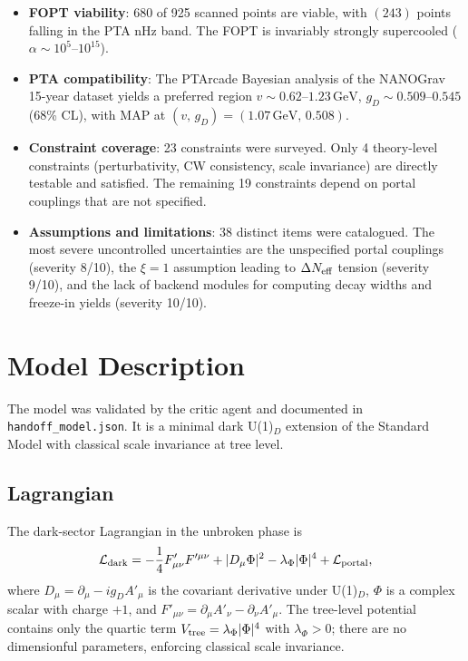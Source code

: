 \documentclass[a4paper,11pt]{article}
\newcommand{\GeV}{\,\text{GeV}}
\begin{document}
\begin{itemize}
\item \textbf{FOPT viability}: 680 of 925 scanned points are viable, with $(243)$ points falling in the PTA nHz band. The FOPT is invariably strongly supercooled ($\alpha \sim 10^5$--$10^{15}$).
\item \textbf{PTA compatibility}: The PTArcade Bayesian analysis of the NANOGrav 15-year dataset yields a preferred region $v \sim 0.62$--$1.23\GeV$, $g_D \sim 0.509$--$0.545$ (68\% CL), with MAP at $(v,\,g_D) = (1.07\GeV,\,0.508)$.
\item \textbf{Constraint coverage}: 23 constraints were surveyed. Only 4 theory-level constraints (perturbativity, CW consistency, scale invariance) are directly testable and satisfied. The remaining 19 constraints depend on portal couplings that are not specified.
\item \textbf{Assumptions and limitations}: 38 distinct items were catalogued. The most severe uncontrolled uncertainties are the unspecified portal couplings (severity 8/10), the $\xi=1$ assumption leading to $\Delta N_{\rm eff}$ tension (severity 9/10), and the lack of backend modules for computing decay widths and freeze-in yields (severity 10/10).
\end{itemize}

\section{Model Description}

The model was validated by the critic agent and documented in \texttt{handoff\_model.json}. It is a minimal dark U(1)$_D$ extension of the Standard Model with classical scale invariance at tree level.

\subsection{Lagrangian}

The dark-sector Lagrangian in the unbroken phase is
\begin{equation}
\mathcal{L}_{\rm dark} = -\frac14 F'_{\mu\nu}F'^{\mu\nu} + |D_\mu\Phi|^2 - \lambda_\Phi |\Phi|^4 + \mathcal{L}_{\rm portal},
\end{equation}
where $D_\mu = \partial_\mu - i g_D A'_\mu$ is the covariant derivative under U(1)$_D$, $\Phi$ is a complex scalar with charge $+1$, and $F'_{\mu\nu} = \partial_\mu A'_\nu - \partial_\nu A'_\mu$. The tree-level potential contains only the quartic term $V_{\rm tree} = \lambda_\Phi |\Phi|^4$ with $\lambda_\Phi > 0$; there are no dimensionful parameters, enforcing classical scale invariance.
\end{document}
